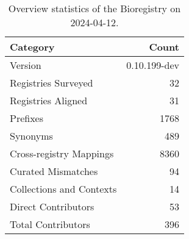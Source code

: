 \begin{table}
\caption{Overview statistics of the Bioregistry on 2024-04-12.}
\label{tab:bioregistry-summary}
\begin{tabular}{lr}
\toprule
Category & Count \\
\midrule
Version & 0.10.199-dev \\
Registries Surveyed & 32 \\
Registries Aligned & 31 \\
Prefixes & 1768 \\
Synonyms & 489 \\
Cross-registry Mappings & 8360 \\
Curated Mismatches & 94 \\
Collections and Contexts & 14 \\
Direct Contributors & 53 \\
Total Contributors & 396 \\
\bottomrule
\end{tabular}
\end{table}
